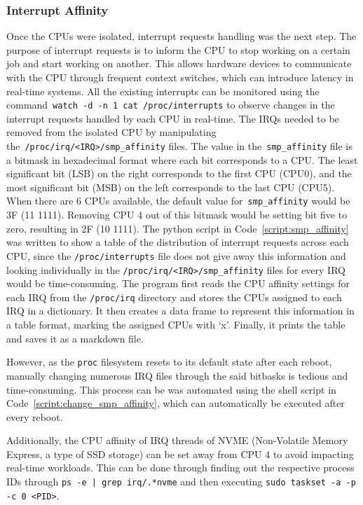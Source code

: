 \documentclass[MMR,Master,english]{twbook}
\begin{document}
\subsubsection{Interrupt Affinity}\label{subsubsec:irq_handling}
Once the CPUs were isolated, interrupt requests handling was the next step. The purpose of interrupt requests is to inform the CPU to stop working on a certain job and start working on another. This allows hardware devices to communicate with the CPU through frequent context switches, which can introduce latency in real-time systems. All the existing interrupts can be monitored using the command~\texttt{watch -d -n 1 cat /proc/interrupts} to observe changes in the interrupt requests handled by each CPU in real-time. The IRQs needed to be removed from the isolated CPU by manipulating the~\texttt{/proc/irq/<IRQ>/smp\_affinity} files. The value in the~\texttt{smp\_affinity} file is a bitmask in hexadecimal format where each bit corresponds to a CPU. The least significant bit (LSB) on the right corresponds to the first CPU (CPU0), and the most significant bit (MSB) on the left corresponds to the last CPU (CPU5). When there are 6 CPUs available, the default value for~\texttt{smp\_affinity} would be 3F (11 1111). Removing CPU 4 out of this bitmask would be setting bit five to zero, resulting in 2F (10 1111). The python script in Code~\ref{script:smp_affinity} was written to show a table of the distribution of interrupt requests across each CPU, since the \texttt{/proc/interrupts} file does not give away this information and looking individually in the \texttt{/proc/irq/<IRQ>/smp\_affinity} files for every IRQ would be time-consuming. The program first reads the CPU affinity settings for each IRQ from the \texttt{/proc/irq} directory and stores the CPUs assigned to each IRQ in a dictionary. It then creates a data frame to represent this information in a table format, marking the assigned CPUs with ‘x’. Finally, it prints the table and saves it as a markdown file.

\bigskip \noindent However, as the \texttt{proc} filesystem resets to its default state after each reboot, manually changing numerous IRQ files through the said bitbasks is tedious and time-consuming. This process can be was automated using the shell script in Code~\ref{script:change_smp_affinity}, which can automatically be executed after every reboot.

\bigskip \noindent Additionally, the CPU affinity of IRQ threads of NVME (Non-Volatile Memory Express, a type of SSD storage) can be set away from CPU 4 to avoid impacting real-time workloads. This can be done through finding out the respective process IDs through \texttt{ps -e | grep irq/.*nvme} and then executing \texttt{sudo taskset -a -p -c 0 <PID>}.
\end{document}
